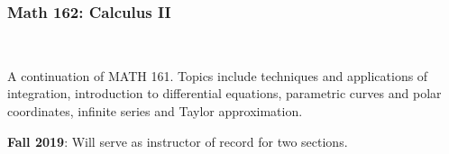\documentclass[teaching.portfolio.tex]{subfiles}
\begin{document}
\subsubsection{Math 162: Calculus II}\hfill\\
\begin{tcolorbox}
  \begin{desc}
    A continuation of MATH 161. Topics include techniques and applications of integration, introduction to differential equations, parametric curves and polar coordinates, infinite series and Taylor approximation.
  \end{desc}
\end{tcolorbox}
\noindent\textbf{Fall 2019}: Will serve as instructor of record for two sections.
\end{document}
